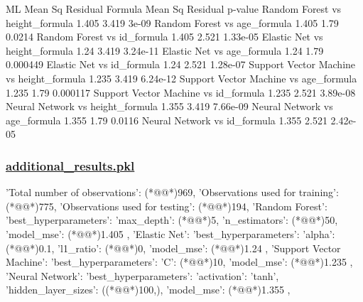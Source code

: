 \documentclass[11pt]{article}
\begin{document}
\begin{codeoutput}
                                          ML Mean Sq Residual  Formula Mean Sq Residual   p-value
Random Forest vs height\_formula                         1.405                     3.419     3e-09
Random Forest vs age\_formula                            1.405                      1.79    0.0214
Random Forest vs id\_formula                             1.405                     2.521  1.33e-05
Elastic Net vs height\_formula                            1.24                     3.419  3.24e-11
Elastic Net vs age\_formula                               1.24                      1.79  0.000449
Elastic Net vs id\_formula                                1.24                     2.521  1.28e-07
Support Vector Machine vs height\_formula                1.235                     3.419  6.24e-12
Support Vector Machine vs age\_formula                   1.235                      1.79  0.000117
Support Vector Machine vs id\_formula                    1.235                     2.521  3.89e-08
Neural Network vs height\_formula                        1.355                     3.419  7.66e-09
Neural Network vs age\_formula                           1.355                      1.79    0.0116
Neural Network vs id\_formula                            1.355                     2.521  2.42e-05
\end{codeoutput}\hypertarget{file-additional-results-pkl}{}

\subsubsection*{\hyperlink{code-Data Analysis-additional-results-pkl}{additional\_results.pkl}}

\begin{codeoutput}
{
    'Total number of observations': (*@@*)969,
    'Observations used for training': (*@@*)775,
    'Observations used for testing': (*@@*)194,
    'Random Forest': {'best\_hyperparameters': {'max\_depth': (*@@*)5, 'n\_estimators': (*@@*)50}, 'model\_mse': (*@@*)1.405             },
    'Elastic Net': {'best\_hyperparameters': {'alpha': (*@@*)0.1, 'l1\_ratio': (*@@*)0}, 'model\_mse': (*@@*)1.24              },
    'Support Vector Machine': {'best\_hyperparameters': {'C': (*@@*)10}, 'model\_mse': (*@@*)1.235             },
    'Neural Network': {'best\_hyperparameters': {'activation': 'tanh', 'hidden\_layer\_sizes': ((*@@*)100,)}, 'model\_mse': (*@@*)1.355             },
}
\end{codeoutput}
\end{document}
